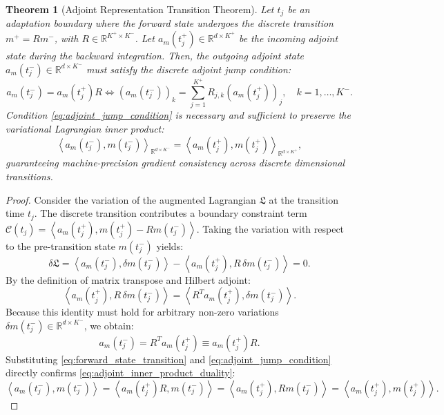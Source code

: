 \documentclass[11pt,a4paper]{article}
\theoremstyle{plain}
\newtheorem{theorem}{Theorem}[section]
\theoremstyle{definition}
\newcommand{\R}{\mathbb{R}}
\newcommand{\inner}[2]{\left\langle #1, #2 \right\rangle}
\begin{document}
\begin{theorem}[Adjoint Representation Transition Theorem]
\label{thm:adjoint_jump}
Let $t_j$ be an adaptation boundary where the forward state undergoes the discrete transition $m^+ = R m^-$, with $R \in \R^{K^+ \times K^-}$. Let $a_m(t_j^+) \in \R^{d \times K^+}$ be the incoming adjoint state during the backward integration. Then, the outgoing adjoint state $a_m(t_j^-) \in \R^{d \times K^-}$ must satisfy the discrete adjoint jump condition:
\begin{equation}
    a_m(t_j^-) = a_m(t_j^+) R \iff \left(a_m(t_j^-)\right)_k = \sum_{j=1}^{K^+} R_{j, k} \left(a_m(t_j^+)\right)_j, \quad k = 1, \dots, K^-.
    \label{eq:adjoint_jump_condition}
\end{equation}
Condition \cref{eq:adjoint_jump_condition} is necessary and sufficient to preserve the variational Lagrangian inner product:
\begin{equation}
    \inner{a_m(t_j^-)}{m(t_j^-)}_{\R^{d \times K^-}} = \inner{a_m(t_j^+)}{m(t_j^+)}_{\R^{d \times K^+}},
    \label{eq:adjoint_inner_product_duality}
\end{equation}
guaranteeing machine-precision gradient consistency across discrete dimensional transitions.
\end{theorem}

\begin{proof}
Consider the variation of the augmented Lagrangian $\mathfrak{L}$ at the transition time $t_j$. The discrete transition contributes a boundary constraint term $\mathcal{C}(t_j) = \inner{a_m(t_j^+)}{m(t_j^+) - R m(t_j^-)}$. Taking the variation with respect to the pre-transition state $m(t_j^-)$ yields:
\begin{equation}
    \delta \mathfrak{L} = \inner{a_m(t_j^-)}{\delta m(t_j^-)} - \inner{a_m(t_j^+)}{R \, \delta m(t_j^-)} = 0.
\end{equation}
By the definition of matrix transpose and Hilbert adjoint:
\begin{equation}
    \inner{a_m(t_j^+)}{R \, \delta m(t_j^-)} = \inner{R^T a_m(t_j^+)}{\delta m(t_j^-)}.
\end{equation}
Because this identity must hold for arbitrary non-zero variations $\delta m(t_j^-) \in \R^{d \times K^-}$, we obtain:
\begin{equation}
    a_m(t_j^-) = R^T a_m(t_j^+) \equiv a_m(t_j^+) R.
\end{equation}
Substituting \cref{eq:forward_state_transition} and \cref{eq:adjoint_jump_condition} directly confirms \cref{eq:adjoint_inner_product_duality}:
\begin{equation}
    \inner{a_m(t_j^-)}{m(t_j^-)} = \inner{a_m(t_j^+) R}{m(t_j^-)} = \inner{a_m(t_j^+)}{R m(t_j^-)} = \inner{a_m(t_j^+)}{m(t_j^+)}.
\end{equation}
\end{proof}
\end{document}
